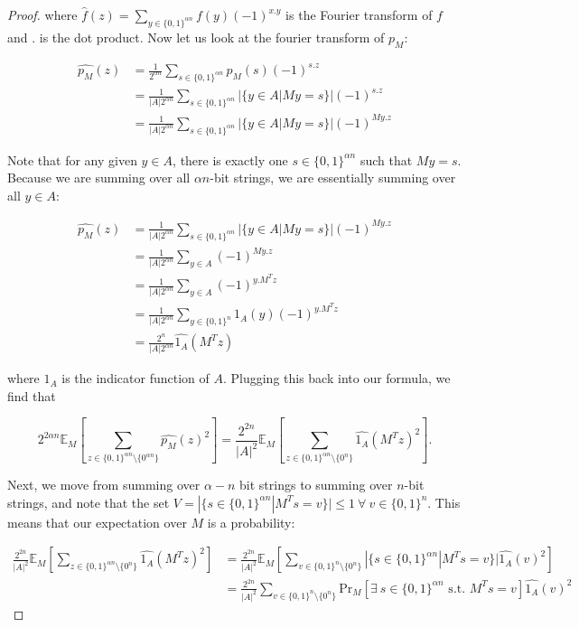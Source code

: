 \documentclass[a4paper]{article}
\begin{document}
\begin{proof}
        where $\widehat{f}(z) = \sum_{y \in \{0, 1\}^{\alpha n}}f(y)(-1)^{x.y}$ is the Fourier transform of $f$ and $.$ is the dot product. Now let us look at the fourier transform of $p_M$:

        \begin{align*}
            \widehat{p_M}(z) &= \frac{1}{2^{\alpha n}}\sum_{s \in \{0, 1\}^{\alpha n}}p_M(s)(-1)^{s.z}\\
            &= \frac{1}{|A|2^{\alpha n}}\sum_{s \in \{0, 1\}^{\alpha n}}|\{y \in A|My = s\}|(-1)^{s.z}\\
            &= \frac{1}{|A|2^{\alpha n}}\sum_{s \in \{0, 1\}^{\alpha n}}|\{y \in A|My = s\}|(-1)^{My.z}
        \end{align*}

        Note that for any given $y \in A$, there is exactly one $s \in \{0, 1\}^{\alpha n}$ such that $My = s$. Because we are summing over all $\alpha n$-bit strings, we are essentially summing over all $y \in A$:

        \begin{align*}
            \widehat{p_M}(z) &= \frac{1}{|A|2^{\alpha n}}\sum_{s \in \{0, 1\}^{\alpha n}}|\{y \in A|My = s\}|(-1)^{My.z}\\
            &= \frac{1}{|A|2^{\alpha n}}\sum_{y \in A}(-1)^{My.z}\\
            &= \frac{1}{|A|2^{\alpha n}}\sum_{y \in A}(-1)^{y.M^Tz}\\
            &= \frac{1}{|A|2^{\alpha n}}\sum_{y \in \{0, 1\}^n}1_A(y)(-1)^{y.M^Tz}\\
            &= \frac{2^n}{|A|2^{\alpha n}}\widehat{1_A}(M^Tz)
        \end{align*}

        where $1_A$ is the indicator function of $A$. Plugging this back into our formula, we find that

        $$2^{2\alpha n}\mathbb{E}_M\left[\sum_{z \in \{0, 1\}^{\alpha n}\setminus\{0^{\alpha n}\}}\widehat{p_M}(z)^2\right] = \frac{2^{2n}}{|A|^2}\mathbb{E}_M\left[\sum_{z \in \{0, 1\}^{\alpha n}\setminus\{0^n\}}\widehat{1_A}(M^Tz)^2\right].$$

        Next, we move from summing over $\alpha-n$ bit strings to summing over $n$-bit strings, and note that the set $V = |\{s \in \{0, 1\}^{\alpha n}|M^Ts = v\}| \leq 1 ~\forall~ v \in \{0, 1\}^n$. This means that our expectation over $M$ is a probability:

        \begin{align*}
            \frac{2^{2n}}{|A|^2}\mathbb{E}_M\left[\sum_{z \in \{0, 1\}^{\alpha n}\setminus\{0^n\}}\widehat{1_A}(M^Tz)^2\right] &= \frac{2^{2n}}{|A|^2}\mathbb{E}_M\left[\sum_{v \in \{0, 1\}^n\setminus\{0^n\}}|\{s \in \{0, 1\}^{\alpha n}|M^Ts = v\}|\widehat{1_A}(v)^2\right]\\
            &= \frac{2^{2n}}{|A|^2}\sum_{v \in \{0, 1\}^n\setminus\{0^n\}}\mathrm{Pr}_M[\exists~ s \in \{0, 1\}^{\alpha n} \textrm{ s.t. } M^Ts = v]\widehat{1_A}(v)^2
        \end{align*}


\end{proof}
\end{document}
